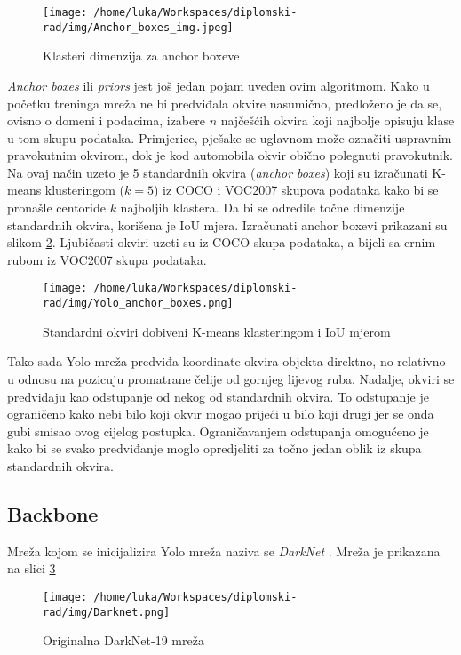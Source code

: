 \begin{figure}[htp]
	\centering
	\texttt{[image: /home/luka/Workspaces/diplomski-rad/img/Anchor\_boxes\_img.jpeg]}
	\caption{Klasteri dimenzija za anchor boxeve}
	\label{img:anchor-boxes}
\end{figure}

\textit{Anchor boxes} ili \textit{priors} jest još jedan pojam uveden ovim algoritmom. Kako u početku treninga mreža ne bi predviđala okvire nasumično, predloženo je da se, ovisno o domeni i podacima, izabere $n$ najčešćih okvira koji najbolje opisuju klase u tom skupu podataka. Primjerice, pješake se uglavnom može označiti uspravnim pravokutnim okvirom, dok je kod automobila okvir obično polegnuti pravokutnik. Na ovaj način uzeto je 5 standardnih okvira (\textit{anchor boxes}) koji su izračunati K-means klusteringom ($k=5$) iz COCO i VOC2007 skupova podataka kako bi se pronašle centoride $k$ najboljih klastera. Da bi se odredile točne dimenzije standardnih okvira, korišena je IoU mjera. Izračunati anchor boxevi prikazani su slikom \ref{img:yolo-anchors}. Ljubičasti okviri uzeti su iz COCO skupa podataka, a bijeli sa crnim rubom iz VOC2007 skupa podataka.

\begin{figure}[htp]
	\centering
	\texttt{[image: /home/luka/Workspaces/diplomski-rad/img/Yolo\_anchor\_boxes.png]}
	\caption{Standardni okviri dobiveni K-means klasteringom i IoU mjerom \citep{YOLO}}
	\label{img:yolo-anchors}
\end{figure}

Tako sada Yolo mreža predviđa koordinate okvira objekta direktno, no relativno u odnosu na pozicuju promatrane čelije od gornjeg lijevog ruba. Nadalje, okviri se predviđaju kao odstupanje od nekog od standardnih okvira. To odstupanje je ograničeno kako nebi bilo koji okvir mogao prijeći u bilo koji drugi jer se onda gubi smisao ovog cijelog postupka. Ograničavanjem odstupanja omogućeno je kako bi se svako predviđanje moglo opredjeliti za točno jedan oblik iz skupa standardnih okvira.

\subsection{Backbone}

Mreža kojom se inicijalizira Yolo mreža naziva se \textit{DarkNet} \citep{Darknet}. Mreža je prikazana na slici \ref{img:darknet}

\begin{figure}[htp]
	\centering
	\texttt{[image: /home/luka/Workspaces/diplomski-rad/img/Darknet.png]}
	\caption{Originalna DarkNet-19 mreža \citep{YOLO}}
	\label{img:darknet}
\end{figure}

